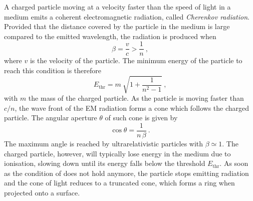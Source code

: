 A charged particle moving at a velocity faster than the speed of light in a medium %
emits a coherent electromagnetic radiation, called \emph{Cherenkov radiation}. %
Provided that the distance covered by the particle in the medium is large compared to the emitted wavelength, %
the radiation is produced when~\cite{Cerenkov:1937vh}
\begin{equation}
	\label{eq:cherenkov}
	\beta = \frac{v}{c} > \frac{1}{n}\ ,
\end{equation}
where $v$ is the velocity of the particle.
The minimum energy of the particle to reach this condition is therefore
\begin{equation}
	\label{eq:cherenkov_threshold}
	E_\text{thr} = m\ \sqrt{1 + \frac{1}{n^2-1}}\ ,
\end{equation}
with $m$ the mass of the charged particle.
As the particle is moving faster than $c / n$, the wave front of the EM radiation forms a cone %
which follows the charged particle.
The angular aperture $\theta$ of such cone is given by
\begin{equation}
	\label{eq:cherenkov_angle}
	\cos \theta = \frac{1}{n\,\beta} \ .
\end{equation}
The maximum angle is reached by ultrarelativistic particles with $\beta \simeq 1$.
The charged particle, however, will typically lose energy in the medium due to ionisation, %
slowing down until its energy falls below the threshold $E_\text{thr}$.
As soon as the condition of  does not hold anymore, %
the particle stops emitting radiation and the cone of light reduces to a truncated cone, %
which forms a ring when projected onto a surface.

